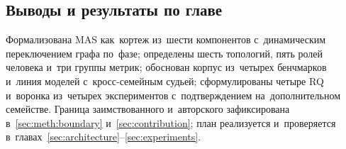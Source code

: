 \subsection{Выводы и результаты по главе}
\label{sec:meth:summary}

Формализована MAS как~кортеж из~шести компонентов с~динамическим
переключением графа по~фазе; определены шесть топологий, пять
ролей человека и~три группы метрик; обоснован корпус из~четырех
бенчмарков и~линия моделей с~кросс-семейным судьей; сформулированы
четыре RQ и~воронка из~четырех экспериментов с~подтверждением
на~дополнительном семействе. Граница заимствованного и~авторского
зафиксирована в~\ref{sec:meth:boundary} и~\ref{sec:contribution};
план реализуется и~проверяется в~главах~\ref{sec:architecture}--\ref{sec:experiments}.
